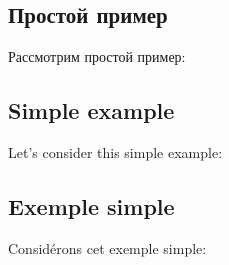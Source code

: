 \ifdefined\RUSSIAN
\subsection{Простой пример}

Рассмотрим простой пример:
\fi

\ifdefined\ENGLISH
\subsection{Simple example}

Let's consider this simple example:
\fi

\ifdefined\GERMAN
\subsection{\DEph{}}

\DEph{}

\fi

\ifdefined\FRENCH
\subsection{Exemple simple}

Considérons cet exemple simple:
\fi






\EN{}
\RU{}
\DE{}
\FR{}

